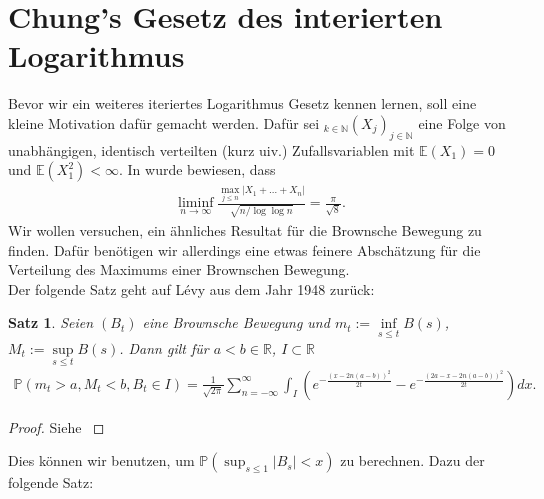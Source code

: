\documentclass[12pt,a4paper]{scrartcl}
\numberwithin{equation}{section}
\newcommand{\R}{\mathbb{R}} %
\newcommand{\N}{\mathbb{N}} %
\numberwithin{equation}{section}%
\newtheorem{satz}[thm]{Satz}%
\theoremstyle{definition}
\begin{document}
\section{Chung's Gesetz des interierten Logarithmus}
Bevor wir ein weiteres iteriertes Logarithmus Gesetz kennen lernen, soll eine kleine Motivation dafür gemacht werden. Dafür sei $_{k \in \N}(X_j)_{j\in\N}$ eine Folge von unabhängigen, identisch verteilten (kurz uiv.) Zufallsvariablen mit $\mathbb{E}(X_1)=0$ und $\mathbb{E}(X_1^2) < \infty$. In \cite[Seite 205-233]{Chung} wurde bewiesen, dass
\begin{align*}
\liminf\limits_{n\to\infty}\frac{\max_{j\leq n}\vert X_1+\dots+X_n\vert}{\sqrt{n/\log\log n}} = \frac{\pi}{\sqrt{8}}.
\end{align*}
\noindent Wir wollen versuchen, ein ähnliches Resultat für die Brownsche Bewegung zu finden. Dafür benötigen wir allerdings eine etwas feinere Abschätzung für die Verteilung des Maximums einer Brownschen Bewegung.\\
Der folgende Satz geht auf Lévy aus dem Jahr 1948 zurück:
\begin{satz}
Seien $(B_t)$ eine Brownsche Bewegung und $m_t:=\inf\limits_{s\leq t} B(s)$, $M_t:=\sup\limits_{s\leq t} B(s)$. Dann gilt für $a<b\in \R$, $I\subset \R$
\begin{align*}
\mathbb{P}(m_t>a,M_t<b,B_t \in I)= \frac{1}{\sqrt{2\pi}} \sum_{n=-\infty}^{\infty} \int_I \left( e^{-\tfrac{(x-2n(a-b))^2}{2t}}-e^{-\tfrac{(2a-x-2n(a-b))^2}{2t}} \right) dx.
\end{align*}
\end{satz}
\begin{proof}
Siehe \cite[Theorem 6.18, Seite 76 ff]{Schilling}
\end{proof}

\noindent
Dies können wir benutzen, um $\mathbb{P}\left( \sup_{s\leq 1} \vert B_s \vert < x \right)$ zu berechnen. Dazu der folgende Satz:
\end{document}

